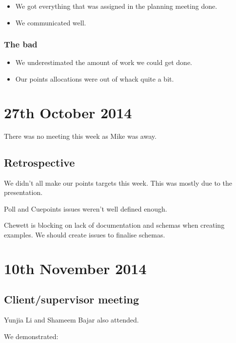 \begin{itemize}
\itemsep1pt\parskip0pt
\item
  We got everything that was assigned in the planning meeting done.
\item
  We communicated well.
\end{itemize}

\subsubsection{The bad}

\begin{itemize}
\itemsep1pt\parskip0pt
\item
  We underestimated the amount of work we could get done.
\item
  Our points allocations were out of whack quite a bit.
\end{itemize}

\section{27th October 2014}\label{Minutes:2014-10-27}

There was no meeting this week as Mike was away.

\subsection{Retrospective}

We didn't all make our points targets this week. This was mostly due to
the presentation.

Poll and Cuepoints issues weren't well defined enough.

Chewett is blocking on lack of documentation and schemas when creating
examples. We should create issues to finalise schemas.

\section{10th November 2014}\label{Minutes:2014-11-10}

\subsection{Client/supervisor meeting}
\label{subsection:Meeting10Nov}

Yunjia Li and Shameem Bajar also attended.

We demonstrated:

